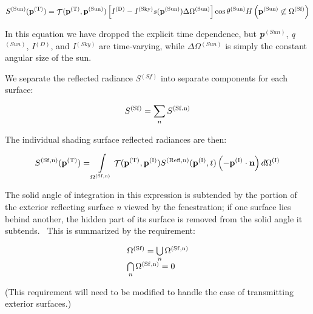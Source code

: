 \begin{equation}
{S^{{\rm{(Sun)}}}}({{\bf{p}}^{{\rm{(T)}}}}) = {\mathop{\rm \mathcal{T}}\nolimits} ({{\bf{p}}^{{\rm{(T)}}}},{{\bf{p}}^{{\rm{(Sun)}}}})\left[ {{I^{{\rm{(D)}}}} - {I^{{\rm{(Sky)}}}}s({{\bf{p}}^{{\rm{(Sun)}}}})\Delta {\Omega ^{{\rm{(Sun)}}}}} \right]\cos {\theta ^{{\rm{(Sun)}}}}H\left( {{{\bf{p}}^{{\rm{(Sun)}}}} \not\subset {\Omega ^{{\rm{(Sf)}}}}} \right)
\end{equation}

In this equation we have dropped the explicit time dependence, but \textbf{\emph{p}}\(^{(Sun)}\), \emph{q}\(^{(Sun)}\), \emph{I}\(^{(D)}\), and \emph{I}\(^{(Sky)}\) are time-varying, while \(\Delta\Omega\)\(^{(Sun)}\) is simply the constant angular size of the sun.

We separate the reflected radiance \emph{S}\(^{(Sf)}\) into separate components for each surface:

\begin{equation}
{S^{{\rm{(Sf)}}}} = \sum\limits_n {{S^{{\rm{(Sf, n)}}}}}
\end{equation}

The individual shading surface reflected radiances are then:

\begin{equation}
{S^{{\rm{(Sf, n)}}}}({{\bf{p}}^{{\rm{(T)}}}}) = \int\limits_{{\Omega ^{{\rm{(Sf, n)}}}}} {{\mathop{\rm \mathcal{T}}\nolimits} ({{\bf{p}}^{{\rm{(T)}}}},{{\bf{p}}^{{\rm{(I)}}}}){S^{{\rm{(Refl, n)}}}}({{\bf{p}}^{{\rm{(I)}}}},t)\left( { - {{\bf{p}}^{{\rm{(I)}}}}\cdot {\bf{n}}} \right)d{\Omega ^{{\rm{(I)}}}}}
\label{eq:SSfnpTEquation}
\end{equation}

The solid angle of integration in this expression is subtended by the portion of the exterior reflecting surface \emph{n} viewed by the fenestration; if one surface lies behind another, the hidden part of its surface is removed from the solid angle it subtends.~ This is summarized by the requirement:

\begin{equation}
\begin{array}{l}{\Omega ^{{\rm{(Sf)}}}} = \bigcup\limits_n {{\Omega ^{{\rm{(Sf, n)}}}}} \\\bigcap\limits_n {{\Omega ^{{\rm{(Sf, n)}}}}}  = 0\end{array}
\end{equation}

(This requirement will need to be modified to handle the case of transmitting exterior surfaces.)

